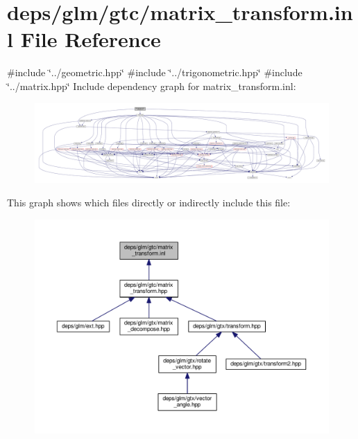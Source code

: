 \hypertarget{matrix__transform_8inl}{}\section{deps/glm/gtc/matrix\+\_\+transform.inl File Reference}
\label{matrix__transform_8inl}
{\ttfamily \#include \char`\"{}../geometric.\+hpp\char`\"{}}\newline
{\ttfamily \#include \char`\"{}../trigonometric.\+hpp\char`\"{}}\newline
{\ttfamily \#include \char`\"{}../matrix.\+hpp\char`\"{}}\newline
Include dependency graph for matrix\+\_\+transform.\+inl\+:
\nopagebreak
\begin{figure}[H]
\begin{center}
\leavevmode
\includegraphics[width=350pt]{df/d7a/matrix__transform_8inl__incl}
\end{center}
\end{figure}
This graph shows which files directly or indirectly include this file\+:
\nopagebreak
\begin{figure}[H]
\begin{center}
\leavevmode
\includegraphics[width=350pt]{d5/d2c/matrix__transform_8inl__dep__incl}
\end{center}
\end{figure}
